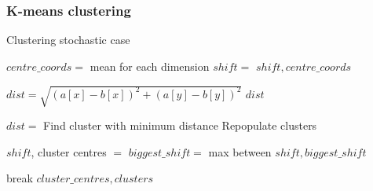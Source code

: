 \newpage
\subsubsection{K-means clustering}

\begin{algorithm}
\label{alg:KMeans}
\caption{Clustering stochastic case}
 \begin{algorithmic}[1]
    \Statex
    
    	\Statex
    		\State $centre\_coords = $ mean for each dimension
    		\State $shift = $
    		\State \Return $shift, centre\_coords$
    	\EndFunction
    
    	\Statex
    		\State $dist = \sqrt{(a[x] - b[x])^2+(a[y] - b[y])^2}$
    		\State \Return $dist$
    	\EndFunction
      
      	\Statex
      				\State $dist = $
      			\EndFor
      			\State Find cluster with minimum distance
      			\State Repopulate clusters
      		\EndFor
      		
      			\State $shift$, cluster centres $=$ 
      			\State $biggest\_shift = $ max between $shift, biggest\_shift$
      			
      		\EndFor
      			\State break
      		\EndIf
      	\EndWhile
      \State \Return $cluster\_centres, clusters$
    \EndFunction

  \end{algorithmic}
\end{algorithm}

